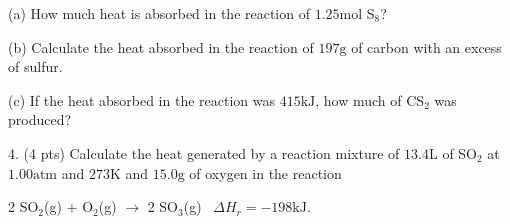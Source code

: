 \documentclass[11pt]{article}
\begin{document}
(a) How much heat is absorbed in the reaction of $1.25\text{mol}$ S$_8$?

(b) Calculate the heat absorbed in the reaction of $197\text{g}$ of carbon
with an excess of sulfur.

(c) If the heat absorbed in the reaction was $415\text{kJ}$, how much of CS$_2$
was produced?

\vspace{2.5in}

4. (4 pts) Calculate the heat generated by a reaction mixture of $13.4\text{L}$ of SO$_2$
at $1.00\text{atm}$ and $273\text{K}$ and $15.0\text{g}$ of oxygen in the reaction

\begin{center}
  2 SO$_2$(g) + O$_2$(g) $\rightarrow$ 2 SO$_3$(g) \, $\Delta H_r = -198\text{kJ}$.
\end{center}
\end{document}
